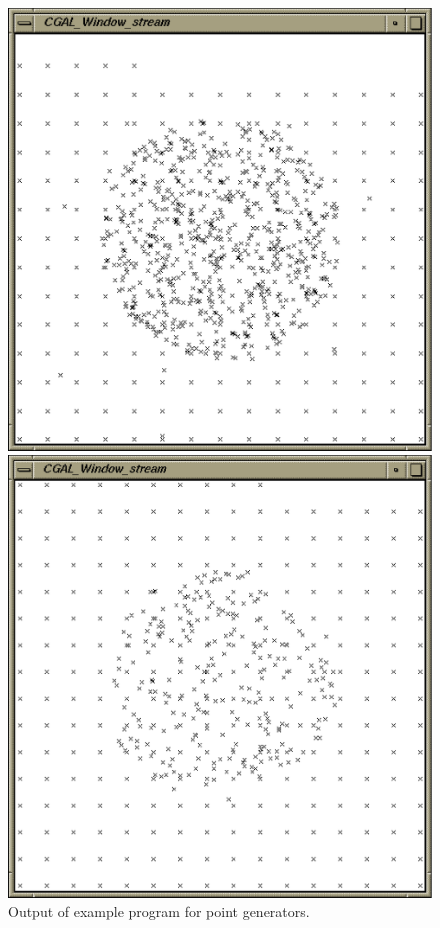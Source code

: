 
\begin{ccTexOnly}
  \begin{figure}
    \noindent
    \hspace*{0.025\textwidth}%
    \begin{minipage}{0.45\textwidth}%
      \includegraphics[width=\textwidth]{generators_prog1.ps}
      \caption{Output of example program for point generators.}
      \label{figurePointGenerator}
    \end{minipage}%
    \hspace*{0.05\textwidth}%
    \begin{minipage}{0.45\textwidth}%
      \includegraphics[width=\textwidth]{generators_prog2.ps}

\end{minipage}
\end{figure}
\end{ccTexOnly}
